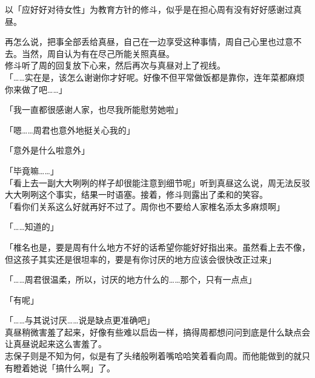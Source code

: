 以「应好好对待女性」为教育方针的修斗，似乎是在担心周有没有好好感谢过真昼。

再怎么说，把事全部丢给真昼，自己在一边享受这种事情，周自己心里也过意不去。当然，周自认为有在尽己所能关照真昼。\\

修斗听了周的回复放下心来，然后再次与真昼对上了视线。\\

「……实在是，该怎么谢谢你才好呢。好像不但平常做饭都是靠你，连年菜都麻烦你来做了吧……」

「我一直都很感谢人家，也尽我所能慰劳她啦」

「嗯……周君也意外地挺关心我的」

「意外是什么啦意外」

「毕竟嘛……」\\

「看上去一副大大咧咧的样子却很能注意到细节呢」听到真昼这么说，周无法反驳大大咧咧这个事实，结果一时语塞。接着，修斗则露出了柔和的笑容。\\

「看你们关系这么好就再好不过了。周你也不要给人家椎名添太多麻烦啊」

「……知道的」

「椎名也是，要是周有什么地方不好的话希望你能好好指出来。虽然看上去不像，但这孩子其实还是很坦率的，要是有你讨厌的地方应该会很快改正过来」

「……周君很温柔，所以，讨厌的地方什么的……那个，只有一点点」

「有呢」

「……与其说讨厌……说是缺点更准确吧」\\

真昼稍微害羞了起来，好像有些难以启齿一样，搞得周都想问问到底是什么缺点会让真昼说起来这么害羞了。\\

志保子则是不知为何，似是有了头绪般咧着嘴哈哈笑着看向周。而他能做到的就只有瞪着她说「搞什么啊」了。
